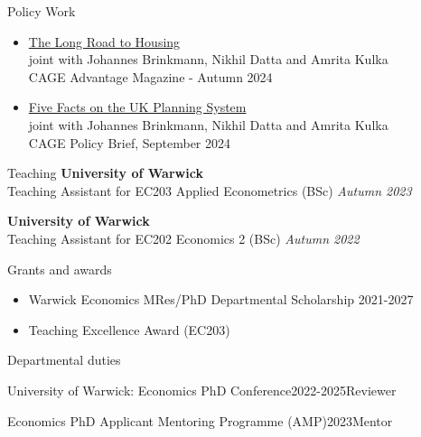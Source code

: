 \documentclass{cv_EB}
\begin{document}

\begin{rSection}{Policy Work}
\smallskip	
\begin{itemize}[leftmargin=0em]
\item {\small \href{https://warwick.ac.uk/fac/soc/economics/research/centres/cage/publications/uow_cage_mag_issue_17_digital_spread.pdf}{The Long Road to Housing} }
\\ {\small joint with Johannes Brinkmann, Nikhil Datta and Amrita Kulka}
\\ {\small CAGE Advantage Magazine - Autumn 2024}

\item {\small \href{https://warwick.ac.uk/fac/soc/economics/research/centres/cage/manage/news/five_facts_on_the_uk_planning_system_-_background_brief.pdf}{Five Facts on the UK Planning System}}
\\ {\small joint with Johannes Brinkmann, Nikhil Datta and Amrita Kulka}
\\ {\small CAGE Policy Brief, September 2024}
				
\end{itemize}
\end{rSection}

 \begin{rSection}{Teaching}
	{\bf University of Warwick}  \\
	Teaching Assistant for EC203 Applied Econometrics (BSc) \hfill {\em Autumn 2023} 
	
	\smallskip 
	
	{\bf University of Warwick}  \\
	Teaching Assistant for EC202 Economics 2 (BSc) \hfill {\em Autumn 2022} 
	
\end{rSection}
 

\newpage
\begin{rSection}{Grants and awards}
\begin{itemize}[leftmargin=*]
\item Warwick Economics MRes/PhD Departmental Scholarship 2021-2027
\item Teaching Excellence Award (EC203)

\end{itemize}
\end{rSection}


\begin{rSection}{Departmental duties}
    \begin{rSubsection}{University of Warwick: Economics PhD Conference}{2022-2025}{Reviewer}{}
    \end{rSubsection}
    \vspace{-1em}
    \begin{rSubsection}{Economics PhD Applicant Mentoring Programme (AMP)}{2023}{Mentor}{}
    \end{rSubsection}
\end{rSection}
\end{document}
